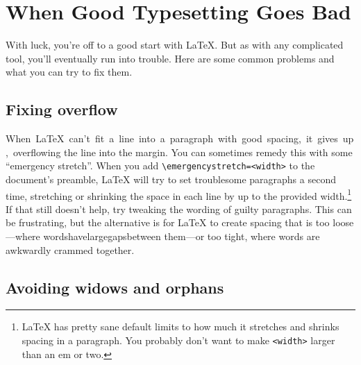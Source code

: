 \chapter{When Good Typesetting Goes Bad}

With luck, you're off to a good start with \LaTeX.
But as with any complicated tool, you'll eventually run into trouble.
Here are some common problems and what you can try to fix them.

\section{Fixing overflow}

\mbox{When \LaTeX{} can't fit a line into a paragraph with good spacing,
it gives up, overflowing} the line into the margin.
You can sometimes remedy this with some ``emergency stretch''\quotekern.
When you add \texttt{\textbackslash emergencystretch=\allowbreak<width>}
to the document's preamble,
\LaTeX{} will try to set troublesome paragraphs a second time,
stretching or shrinking the space in each line by up to the provided
width.\punckern\footnote{\LaTeX{} has pretty sane default limits to how much
it stretches and shrinks spacing in a paragraph.
You probably don't want to make \texttt{<width>} larger than an em or two.}
If that still doesn't help, try tweaking the wording of guilty paragraphs.
This can be frustrating, but the alternative is for \LaTeX{} to create spacing
that is too loose---where\quad
words\quad have\quad large\quad gaps\quad between\quad
them---or too tight, where\! words\! are\! awkwardly\! crammed\! together.

\section{Avoiding widows and orphans}

